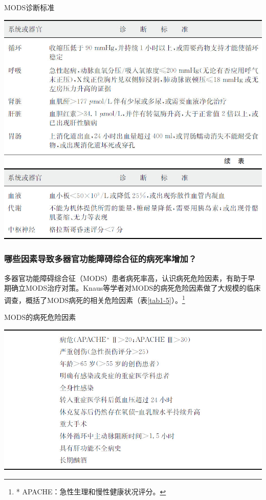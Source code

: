 \begin{table}[htbp]
\centering
\caption{MODS诊断标准}
\label{tab1-4}
\includegraphics[width=\textwidth,height=\textheight,keepaspectratio]{./images/Image00007.jpg}
\includegraphics[width=\textwidth,height=\textheight,keepaspectratio]{./images/Image00008.jpg}
\end{table}

\subsubsection{哪些因素导致多器官功能障碍综合征的病死率增加？}

多器官功能障碍综合征（MODS）患者病死率高，认识病死危险因素，有助于早期确立MODS治疗对策。Knaus等学者对MODS的病死危险因素做了大规模的临床调查，概括了MODS病死的相关危险因素（表\ref{tab1-5}）。\footnote{* APACHE：急性生理和慢性健康状况评分。}

\begin{table}[htbp]
\centering
\caption{MODS的病死危险因素}
\label{tab1-5}
\includegraphics[width=\textwidth,height=\textheight,keepaspectratio]{./images/Image00009.jpg}
\end{table}

